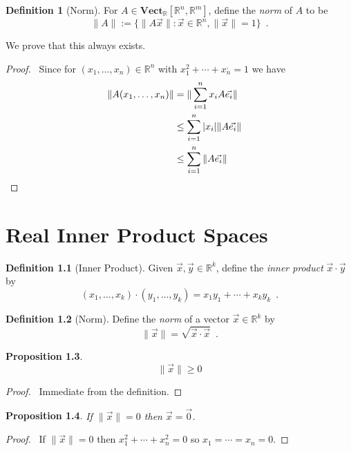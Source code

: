 \documentclass{book}
\let\qed\relax
\newtheorem{prop}{Proposition}[chapter]
\theoremstyle{definition}
\newtheorem{df}[prop]{Definition}
\begin{document}
\begin{df}[Norm]
For $A \in \mathbf{Vect}_\mathbb{R}[\mathbb{R}^n, \mathbb{R}^m]$, define the \emph{norm} of $A$ to be
\[ \| A \| := \{ \| A \vec{x} \| : \vec{x} \in \mathbb{R}^n, \| \vec{x} \| = 1 \} \enspace . \]

We prove that this always exists.
\end{df}

\begin{proof}
\pf\ Since for $(x_1, \ldots, x_n) \in \mathbb{R}^n$ with $x_1^2 + \cdots + x_n^, = 1$ we have
\begin{align*}
\| A (x_1, \ldots, x_n) \| & = \| \sum_{i=1}^n x_i A \vec{e_i} \| \\
& \leq \sum_{i=1}^n |x_i| \| A \vec{e_i} \| \\
& \leq \sum_{i=1}^n \| A \vec{e_i} \| & \qed
\end{align*}
\end{proof}

\chapter{Real Inner Product Spaces}

\begin{df}[Inner Product]
Given $\vec{x}, \vec{y} \in \mathbb{R}^k$, define the \emph{inner product} $\vec{x} \cdot \vec{y}$ by
\[ (x_1, \ldots, x_k) \cdot (y_1, \ldots, y_k) = x_1 y_1 + \cdots + x_k y_k \enspace . \]
\end{df}

\begin{df}[Norm]
Define the \emph{norm} of a vector $\vec{x} \in \mathbb{R}^k$ by
\[ \|\vec{x}\| = \sqrt{\vec{x} \cdot \vec{x}} \enspace . \]
\end{df}

\begin{prop}
\[ \|\vec{x}\| \geq 0 \]
\end{prop}

\begin{proof}
\pf\ Immediate from the definition. \qed
\end{proof}

\begin{prop}
If $\|\vec{x}\| = 0$ then $\vec{x} = \vec{0}$.
\end{prop}

\begin{proof}
\pf\ If $\|\vec{x}\| = 0$ then $x_1^2 + \cdots + x_n^2 = 0$ so $x_1 = \cdots = x_n = 0$. \qed
\end{proof}
\end{document}
